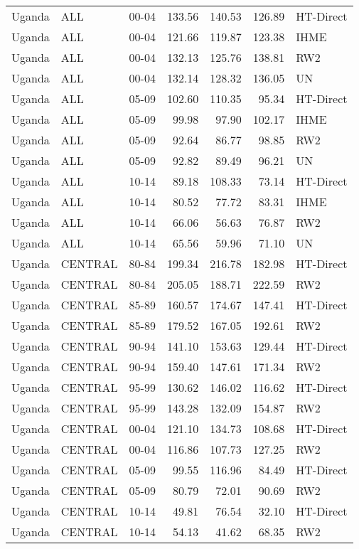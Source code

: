 \begin{longtable}{lllrrrl}
  Uganda & ALL & 00-04 & 133.56 & 140.53 & 126.89 & HT-Direct \\ 
  Uganda & ALL & 00-04 & 121.66 & 119.87 & 123.38 & IHME \\ 
  Uganda & ALL & 00-04 & 132.13 & 125.76 & 138.81 & RW2 \\ 
  Uganda & ALL & 00-04 & 132.14 & 128.32 & 136.05 & UN \\ 
  Uganda & ALL & 05-09 & 102.60 & 110.35 & 95.34 & HT-Direct \\ 
  Uganda & ALL & 05-09 & 99.98 & 97.90 & 102.17 & IHME \\ 
  Uganda & ALL & 05-09 & 92.64 & 86.77 & 98.85 & RW2 \\ 
  Uganda & ALL & 05-09 & 92.82 & 89.49 & 96.21 & UN \\ 
  Uganda & ALL & 10-14 & 89.18 & 108.33 & 73.14 & HT-Direct \\ 
  Uganda & ALL & 10-14 & 80.52 & 77.72 & 83.31 & IHME \\ 
  Uganda & ALL & 10-14 & 66.06 & 56.63 & 76.87 & RW2 \\ 
  Uganda & ALL & 10-14 & 65.56 & 59.96 & 71.10 & UN \\ 
  Uganda & CENTRAL & 80-84 & 199.34 & 216.78 & 182.98 & HT-Direct \\ 
  Uganda & CENTRAL & 80-84 & 205.05 & 188.71 & 222.59 & RW2 \\ 
  Uganda & CENTRAL & 85-89 & 160.57 & 174.67 & 147.41 & HT-Direct \\ 
  Uganda & CENTRAL & 85-89 & 179.52 & 167.05 & 192.61 & RW2 \\ 
  Uganda & CENTRAL & 90-94 & 141.10 & 153.63 & 129.44 & HT-Direct \\ 
  Uganda & CENTRAL & 90-94 & 159.40 & 147.61 & 171.34 & RW2 \\ 
  Uganda & CENTRAL & 95-99 & 130.62 & 146.02 & 116.62 & HT-Direct \\ 
  Uganda & CENTRAL & 95-99 & 143.28 & 132.09 & 154.87 & RW2 \\ 
  Uganda & CENTRAL & 00-04 & 121.10 & 134.73 & 108.68 & HT-Direct \\ 
  Uganda & CENTRAL & 00-04 & 116.86 & 107.73 & 127.25 & RW2 \\ 
  Uganda & CENTRAL & 05-09 & 99.55 & 116.96 & 84.49 & HT-Direct \\ 
  Uganda & CENTRAL & 05-09 & 80.79 & 72.01 & 90.69 & RW2 \\ 
  Uganda & CENTRAL & 10-14 & 49.81 & 76.54 & 32.10 & HT-Direct \\ 
  Uganda & CENTRAL & 10-14 & 54.13 & 41.62 & 68.35 & RW2 \\ 

\end{longtable}
